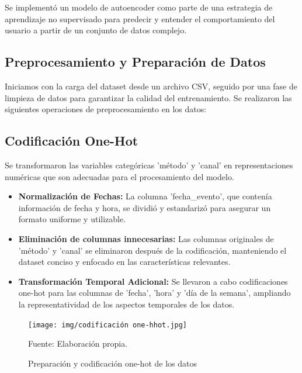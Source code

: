 Se implementó un modelo de autoencoder como parte de una estrategia de aprendizaje no supervisado para predecir y entender el comportamiento del usuario a partir de un conjunto de datos complejo.

\subsection{Preprocesamiento y Preparación de Datos}

Iniciamos con la carga del dataset desde un archivo CSV, seguido por una fase de limpieza de datos para garantizar la calidad del entrenamiento. Se realizaron las siguientes operaciones de preprocesamiento en los datos:

\subsection{Codificación One-Hot}

Se transformaron las variables categóricas 'método' y 'canal' en representaciones numéricas que son adecuadas para el procesamiento del modelo.

\begin{itemize}
    \item \textbf{Normalización de Fechas:} La columna 'fecha\_evento', que contenía información de fecha y hora, se dividió y estandarizó para asegurar un formato uniforme y utilizable.
    \item \textbf{Eliminación de columnas innecesarias:} Las columnas originales de 'método' y 'canal' se eliminaron después de la codificación, manteniendo el dataset conciso y enfocado en las características relevantes.
    \item \textbf{Transformación Temporal Adicional:} Se llevaron a cabo codificaciones one-hot para las columnas de 'fecha', 'hora' y 'día de la semana', ampliando la representatividad de los aspectos temporales de los datos.
\end{itemize}

\begin{figure}[H]
    \begin{minipage}[t]{0.9\textwidth}
        \caption{Preparación y codificación one-hot de los datos}
        \label{codificación_autoencoder}        
    \end{minipage}

    \vspace{10pt}

    \begin{minipage}[b]{0.9\textwidth}
        \centering
        \texttt{[image: img/codificación one-hhot.jpg]}        
    \end{minipage}

    \begin{minipage}[t]{0.9\textwidth}
        Fuente: Elaboración propia.
    \end{minipage}
\end{figure}


